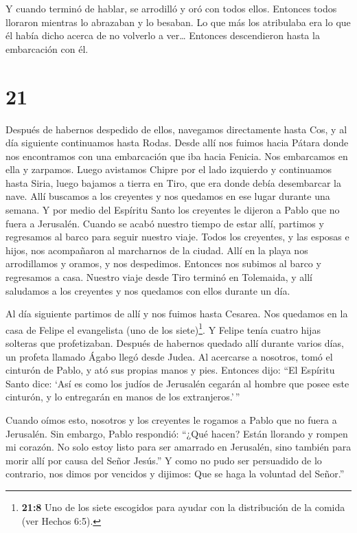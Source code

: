  Y cuando terminó de hablar, se arrodilló y oró con todos
ellos.  Entonces todos lloraron mientras lo abrazaban y lo
besaban.  Lo que más los atribulaba era lo que él había
dicho acerca de no volverlo a ver\ldots{} Entonces descendieron hasta la
embarcación con él.

\hypertarget{section-20}{%
\section{21}\label{section-20}}

 Después de habernos despedido de ellos, navegamos
directamente hasta Cos, y al día siguiente continuamos hasta Rodas.
Desde allí nos fuimos hacia Pátara  donde nos encontramos
con una embarcación que iba hacia Fenicia. Nos embarcamos en ella y
zarpamos.  Luego avistamos Chipre por el lado izquierdo y
continuamos hasta Siria, luego bajamos a tierra en Tiro, que era donde
debía desembarcar la nave.  Allí buscamos a los creyentes y
nos quedamos en ese lugar durante una semana. Y por medio del Espíritu
Santo los creyentes le dijeron a Pablo que no fuera a Jerusalén.
 Cuando se acabó nuestro tiempo de estar allí, partimos y
regresamos al barco para seguir nuestro viaje. Todos los creyentes, y
las esposas e hijos, nos acompañaron al marcharnos de la ciudad. Allí en
la playa nos arrodillamos y oramos, y nos despedimos. 
Entonces nos subimos al barco y regresamos a casa.  Nuestro
viaje desde Tiro terminó en Tolemaida, y allí saludamos a los creyentes
y nos quedamos con ellos durante un día.

 Al día siguiente partimos de allí y nos fuimos hasta
Cesarea. Nos quedamos en la casa de Felipe el evangelista (uno de los
siete)\footnote{\textbf{21:8} Uno de los siete escogidos para ayudar con
  la distribución de la comida (ver Hechos 6:5).}.  Y Felipe
tenía cuatro hijas solteras que profetizaban.  Después de
habernos quedado allí durante varios días, un profeta llamado Ágabo
llegó desde Judea.  Al acercarse a nosotros, tomó el
cinturón de Pablo, y ató sus propias manos y pies. Entonces dijo: ``El
Espíritu Santo dice: `Así es como los judíos de Jerusalén cegarán al
hombre que posee este cinturón, y lo entregarán en manos de los
extranjeros.'\,''

 Cuando oímos esto, nosotros y los creyentes le rogamos a
Pablo que no fuera a Jerusalén.  Sin embargo, Pablo
respondió: ``¿Qué hacen? Están llorando y rompen mi corazón. No solo
estoy listo para ser amarrado en Jerusalén, sino también para morir allí
por causa del Señor Jesús.''  Y como no pudo ser persuadido
de lo contrario, nos dimos por vencidos y dijimos: Que se haga la
voluntad del Señor.''

